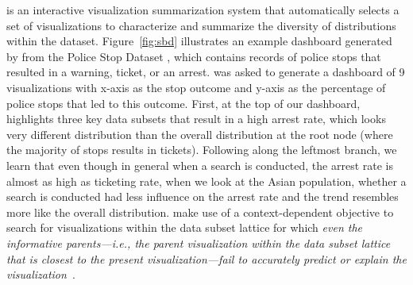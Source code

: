 \par \sbd is an interactive visualization 
summarization system that automatically 
selects a set of visualizations 
to characterize and summarize 
the diversity of distributions within the dataset. 
Figure~\ref{fig:sbd} illustrates 
an example dashboard generated by \sbd 
from the Police Stop Dataset \cite{police}, 
which contains records of police stops 
that resulted in a warning, ticket, or an arrest. 
\sbd was asked to generate 
a dashboard of 9 visualizations 
with x-axis as the stop outcome
and y-axis as the percentage of police stops that led to this outcome. 
First, at the top of our dashboard, 
\sbd highlights three key data subsets 
that result in a high arrest rate, 
which looks very different distribution
than the overall distribution at the root node 
(where the majority of stops results in tickets). 
Following along the leftmost branch, we learn that even though in general when a search is conducted, the arrest rate is 
almost as high as ticketing rate, 
when we look at the Asian population, 
whether a search is conducted had less influence 
on the arrest rate and the trend resembles more like the overall distribution. 
\sbd make use of a context-dependent objective 
to search for visualizations within 
the data subset lattice
for which \emph{even the informative parents---i.e., the parent visualization
within the data subset lattice that is closest to the present visualization---fail to accurately predict or explain the visualization}~\cite{Lee2018}. 

